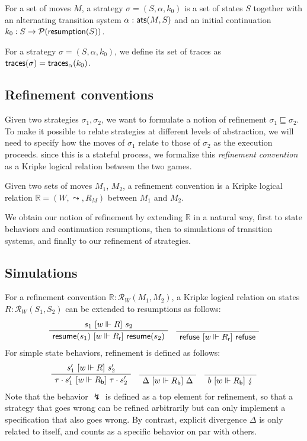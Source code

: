 \begin{definition}[Strategy]
For a set of moves $M$,
a strategy $\sigma = (S, \alpha, k_0)$
is a set of states $S$ together with
an alternating transition system $\alpha :  \mathsf{ats} (M, S)$ and
an initial continuation $k_0 : S \rightarrow \mathcal{P}( \mathsf{resumption} (S))$.
\end{definition}

For a strategy $\sigma = (S, \alpha, k_0)$,
we define its set of traces as
$ \mathsf{traces} (\sigma) =  \mathsf{traces} _\alpha (k_0)$.

\subsection{Refinement conventions}

Given two strategies $\sigma_1, \sigma_2$,
we want to formulate a notion of refinement
$\sigma_1 \sqsubseteq \sigma_2$.
To make it possible to relate strategies at different
levels of abstraction,
we will need to specify how the moves of $\sigma_1$
relate to those of $\sigma_2$
as the execution proceeds.
since this is a stateful process,
we formalize this \emph{refinement convention}
as a Kripke logical relation between the two games.

\begin{definition}
Given two sets of moves $M_1$, $M_2$,
a refinement convention
is a Kripke logical relation $\mathbb{R} = (W, \leadsto, R_M)$
between $M_1$ and $M_2$.
\end{definition}

We obtain our notion of refinement by extending $\mathbb{R}$
in a natural way,
first to state behaviors and continuation resumptions,
then to simulations of transition systems,
and finally to our refinement of strategies.

\subsection{Simulations}

For a refinement convention $\mathbb{R} : \mathcal{R}_W(M_1, M_2)$,
a Kripke logical relation on states $R : \mathcal{R}_W(S_1, S_2)$
can be extended to resumptions as follows:
\[
  \AxiomC{$s_1 \ifr{w \Vdash R} s_2$}
  \UnaryInfC{$\kw{resume}(s_1) \ifr{w \Vdash R_\kw{r}} \kw{resume}(s_2)$}
  \DisplayProof
  \quad
  \AxiomC{\rule{0pt}{\baselineskip}}
  \UnaryInfC{$\kw{refuse} \ifr{w \Vdash R_\kw{r}} \kw{refuse}$}
  \DisplayProof
\]
For simple state behaviors,
refinement is defined as follows:
\[
  \AxiomC{$s_1' \ifr{w \Vdash R} s_2'$}
  \UnaryInfC{$\tau \cdot s_1' \ifr{w \Vdash R_\kw{b}} \tau \cdot s_2'$}
  \DisplayProof
  \quad
  \AxiomC{\rule{0pt}{\baselineskip}}
  \UnaryInfC{$\Delta \ifr{w \Vdash R_\kw{b}} \Delta$}
  \DisplayProof
  \quad
  \AxiomC{\rule{0pt}{\baselineskip}}
  \UnaryInfC{$b \ifr{w \Vdash R_\kw{b}} \lightning$}
  \DisplayProof
\]
Note that the behavior $\lightning$ is defined as a top element
for refinement,
so that a strategy that goes wrong can be refined arbitrarily
but can only implement a specification that
also goes wrong.
By contrast,
explicit divergence $\Delta$
is only related to itself,
and counts as a specific behavior on par with others.

